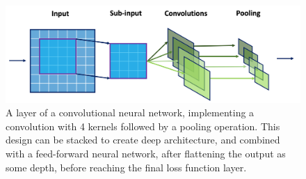 \begin{figure}[h!]
    \center
    \includegraphics[scale=0.5]{Images/ML/cnn.png}
    \caption{A layer of a convolutional neural network, implementing a convolution with 4 kernels followed by a pooling operation. This design can be stacked to create deep architecture, and combined with a feed-forward neural network, after flattening the output as some depth, before reaching the final loss function layer.} 
    \label{fig:cnnDesign}
\end{figure}

